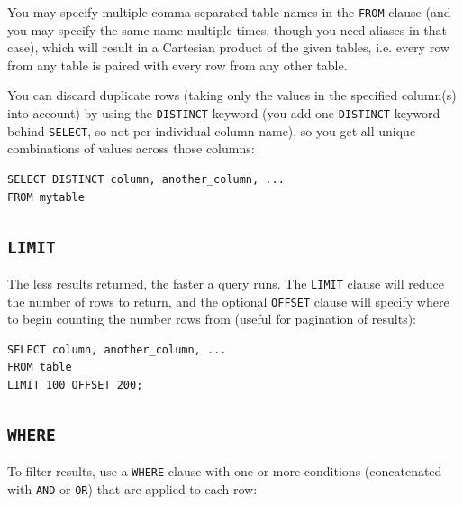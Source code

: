 \documentclass[table, xcdraw]{article}%
\begin{document}
You may specify multiple comma-separated table names in the \texttt{FROM} clause (and you may specify the same name multiple times, though you need aliases in that case), which will result in a Cartesian product of the given tables, i.e. every row from any table is paired with every row from any other table.

You can discard duplicate rows (taking only the values in the specified column(s) into account) by using the \texttt{DISTINCT} keyword (you add one \texttt{DISTINCT} keyword behind \texttt{SELECT}, so not per individual column name), so you get all unique combinations of values across those columns:

\begin{verbatim}
SELECT DISTINCT column, another_column, ...
FROM mytable
\end{verbatim}

\subsection{\texttt{LIMIT}}

The less results returned, the faster a query runs. The \texttt{LIMIT} clause will reduce the number of rows to return, and the optional \texttt{OFFSET} clause will specify where to begin counting the number rows from (useful for pagination of results):

\begin{verbatim}
SELECT column, another_column, ...
FROM table
LIMIT 100 OFFSET 200;
\end{verbatim}

\subsection{\texttt{WHERE}}

To filter results, use a \texttt{WHERE} clause with one or more conditions (concatenated with \texttt{AND} or \texttt{OR}) that are applied to each row:
\end{document}

